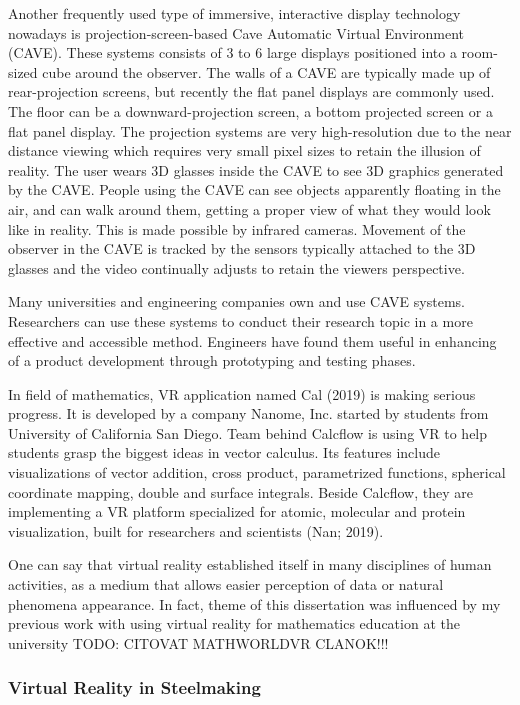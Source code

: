 Another frequently used type of immersive, interactive display technology nowadays is projection-screen-based Cave Automatic Virtual Environment (CAVE). These systems consists of 3 to 6 large displays positioned into a room-sized cube around the observer. The walls of a CAVE are typically made up of rear-projection screens, but recently the flat panel displays are commonly used. The floor can be a downward-projection screen, a bottom projected screen or a flat panel display. The projection systems are very high-resolution due to the near distance viewing which requires very small pixel sizes to retain the illusion of reality. The user wears 3D glasses inside the CAVE to see 3D graphics generated by the CAVE. People using the CAVE can see objects apparently floating in the air, and can walk around them, getting a proper view of what they would look like in reality. This is made possible by infrared cameras. Movement of the observer in the CAVE is tracked by the sensors typically attached to the 3D glasses and the video continually adjusts to retain the viewers perspective.

Many universities and engineering companies own and use CAVE systems. Researchers can use these systems to conduct their research topic in a more effective and accessible method. Engineers have found them useful in enhancing of a product development through prototyping and testing phases.

In field of mathematics, VR application named Cal (2019) is making serious progress. It is developed by a company Nanome, Inc. started by students from University of California San Diego. Team behind Calcflow is using VR to help students grasp the biggest ideas in vector calculus. Its features include visualizations of vector addition, cross product, parametrized functions, spherical coordinate mapping, double and surface integrals. Beside Calcflow, they are implementing a VR platform specialized for atomic, molecular and protein visualization, built for researchers and scientists (Nan; 2019).

One can say that virtual reality established itself in many disciplines of human activities, as a medium that allows easier perception of data or natural phenomena appearance. In fact, theme of this dissertation was influenced by my previous work with using virtual reality for mathematics education at the university TODO: CITOVAT MATHWORLDVR CLANOK!!!

\subsubsection{Virtual Reality in Steelmaking}

